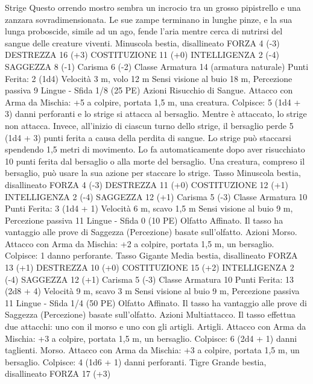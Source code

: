 \begin{multicols}{2}
Strige
Questo orrendo mostro sembra un incrocio tra un
grosso pipistrello e una zanzara sovradimensionata. Le
sue zampe terminano in lunghe pinze, e la sua lunga
proboscide, simile ad un ago, fende l’aria mentre cerca
di nutrirsi del sangue delle creature viventi.
Minuscola bestia, disallineato
FORZA 4 (-3)
DESTREZZA 16 (+3)
COSTITUZIONE 11 (+0)
INTELLIGENZA 2 (-4)
SAGGEZZA 8 (-1)
Carisma 6 (-2)
Classe Armatura 14 (armatura naturale)
\hspace*{0pt}\hfill{Punti Ferita}: 2 (1d4)
Velocità 3 m, volo 12 m
Sensi visione al buio 18 m, Percezione passiva 9
Lingue -
Sfida 1/8 (25 PE)
Azioni
Risucchio di Sangue. Attacco con Arma da Mischia: +5 a
colpire, portata 1,5 m, una creatura.
Colpisce: 5 (1d4 + 3) danni perforanti e lo strige si attacca al
bersaglio. Mentre è attaccato, lo strige non attacca. Invece,
all’inizio di ciascun turno dello strige, il bersaglio perde 5 (1d4 +
3) punti ferita a causa della perdita di sangue.
Lo strige può staccarsi spendendo 1,5 metri di movimento. Lo fa
automaticamente dopo aver risucchiato 10 punti ferita dal
bersaglio o alla morte del bersaglio. Una creatura, compreso il
bersaglio, può usare la sua azione per staccare lo strige.
Tasso
Minuscola bestia, disallineato
FORZA 4 (-3)
DESTREZZA 11 (+0)
COSTITUZIONE 12 (+1)
INTELLIGENZA 2 (-4)
SAGGEZZA 12 (+1)
Carisma 5 (-3)
Classe Armatura 10
\hspace*{0pt}\hfill{Punti Ferita}: 3 (1d4 + 1)
Velocità 6 m, scavo 1,5 m
Sensi visione al buio 9 m, Percezione passiva 11
Lingue -
Sfida 0 (10 PE)
Olfatto Affinato. Il tasso ha vantaggio alle prove di Saggezza
(Percezione) basate sull’olfatto.
Azioni
Morso. Attacco con Arma da Mischia: +2 a colpire, portata 1,5
m, un bersaglio.
Colpisce: 1 danno perforante.
Tasso Gigante
Media bestia, disallineato
FORZA 13 (+1)
DESTREZZA 10 (+0)
COSTITUZIONE 15 (+2)
INTELLIGENZA 2 (-4)
SAGGEZZA 12 (+1)
Carisma 5 (-3)
Classe Armatura 10
\hspace*{0pt}\hfill{Punti Ferita}: 13 (2d8 + 4)
Velocità 9 m, scavo 3 m
Sensi visione al buio 9 m, Percezione passiva 11
Lingue -
Sfida 1/4 (50 PE)
Olfatto Affinato. Il tasso ha vantaggio alle prove di Saggezza
(Percezione) basate sull’olfatto.
Azioni
Multiattacco. Il tasso effettua due attacchi: uno con il morso e
uno con gli artigli.
Artigli. Attacco con Arma da Mischia: +3 a colpire, portata 1,5
m, un bersaglio.
Colpisce: 6 (2d4 + 1) danni taglienti.
Morso. Attacco con Arma da Mischia: +3 a colpire, portata 1,5
m, un bersaglio.
Colpisce: 4 (1d6 + 1) danni perforanti.
Tigre
Grande bestia, disallineato
FORZA 17 (+3)

\end{multicols}
